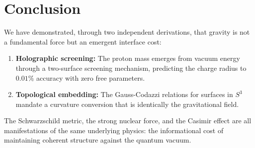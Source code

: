 \documentclass[12pt, a4paper]{article}
\theoremstyle{plain}
\theoremstyle{definition}
\begin{document}
\section{Conclusion}\label{sec:conclusion}

We have demonstrated, through two independent derivations, that gravity is
not a fundamental force but an emergent interface cost:

\begin{enumerate}
  \item \textbf{Holographic screening:} The proton mass emerges from
    vacuum energy through a two-surface screening mechanism, predicting
    the charge radius to $0.01\%$ accuracy with zero free parameters.
  \item \textbf{Topological embedding:} The Gauss-Codazzi relations for
    surfaces in $S^3$ mandate a curvature conversion that is identically
    the gravitational field.
\end{enumerate}

The Schwarzschild metric, the strong nuclear force, and the Casimir effect
are all manifestations of the same underlying physics: the informational
cost of maintaining coherent structure against the quantum vacuum.


\vspace{2em}
\noindent\hrulefill
\vspace{1em}







\vspace{3em}
\noindent\hrulefill
\vspace{1em}
\end{document}
